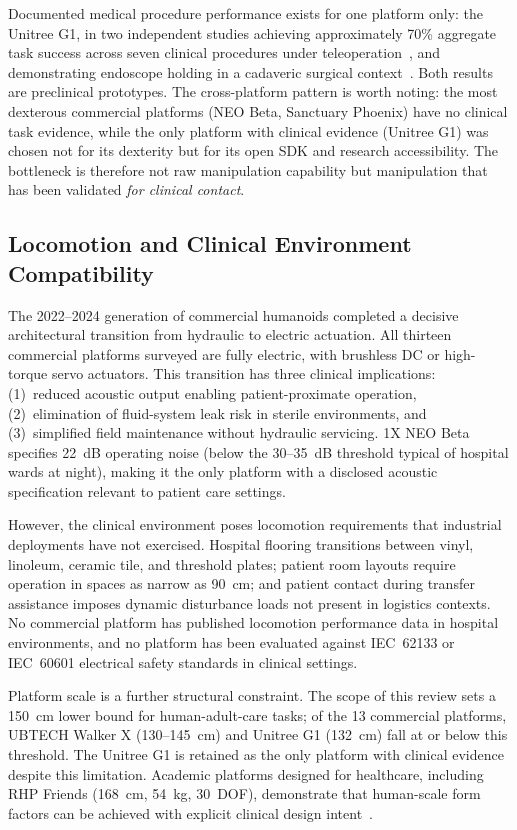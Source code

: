 \documentclass[acmsmall]{acmart}
\begin{document}
Documented medical procedure performance exists for one platform only: the
Unitree G1, in two independent studies achieving approximately 70\% aggregate
task success across seven clinical procedures under teleoperation~\cite{atar2025humanoids},
and demonstrating endoscope holding in a cadaveric surgical context~\cite{cho2026humanoid}.
Both results are preclinical prototypes. The cross-platform pattern is worth
noting: the most dexterous commercial platforms (NEO Beta, Sanctuary Phoenix)
have no clinical task evidence, while the only platform with clinical evidence
(Unitree G1) was chosen not for its dexterity but for its open SDK and research
accessibility. The bottleneck is therefore not raw manipulation capability but
manipulation that has been validated \emph{for clinical contact}.

\subsection{Locomotion and Clinical Environment Compatibility}
\label{sec:locomotion}

The 2022--2024 generation of commercial humanoids completed a decisive architectural
transition from hydraulic to electric actuation. All thirteen commercial platforms
surveyed are fully electric, with brushless DC or high-torque servo actuators.
This transition has three clinical implications: (1)~reduced acoustic output
enabling patient-proximate operation, (2)~elimination of fluid-system leak risk
in sterile environments, and (3)~simplified field maintenance without hydraulic
servicing. 1X NEO Beta specifies 22~dB operating noise (below the 30--35~dB
threshold typical of hospital wards at night), making it the only platform with
a disclosed acoustic specification relevant to patient care settings.

However, the clinical environment poses locomotion requirements that industrial
deployments have not exercised. Hospital flooring transitions between vinyl,
linoleum, ceramic tile, and threshold plates; patient room layouts require
operation in spaces as narrow as 90~cm; and patient contact during transfer
assistance imposes dynamic disturbance loads not present in logistics contexts.
No commercial platform has published locomotion performance data in hospital
environments, and no platform has been evaluated against IEC~62133 or IEC~60601
electrical safety standards in clinical settings.

Platform scale is a further structural constraint. The scope of this review sets
a 150~cm lower bound for human-adult-care tasks; of the 13 commercial platforms,
UBTECH Walker X (130--145~cm) and Unitree G1 (132~cm) fall at or below this
threshold. The Unitree G1 is retained as the only platform with clinical evidence
despite this limitation. Academic platforms designed for healthcare, including
RHP Friends (168~cm, 54~kg, 30~DOF), demonstrate that human-scale form factors
can be achieved with explicit clinical design intent~\cite{benallegue2025rhp}.
\end{document}
